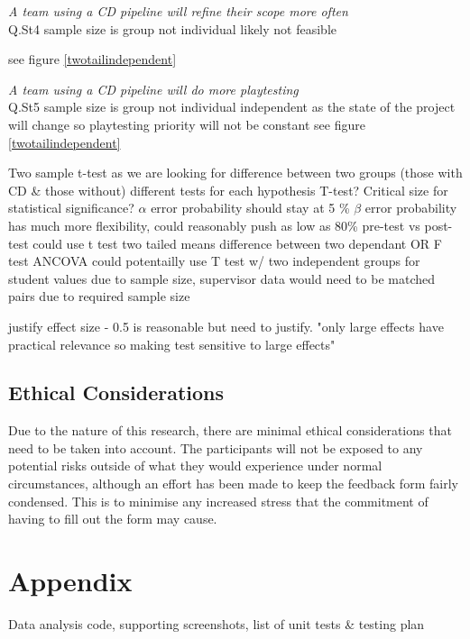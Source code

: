 \documentclass[lettersize,journal]{IEEEtran}
\begin{document}
        \textit{A team using a CD pipeline will refine their scope more often} \\
            Q.St4
            sample size is group not individual
            likely not feasible

            see figure \ref{twotailindependent}

        \textit{A team using a CD pipeline will do more playtesting} \\
            Q.St5
            sample size is group not individual
            independent as the state of the project will change so playtesting priority will not be constant
            see figure \ref{twotailindependent}
    
        Two sample t-test as we are looking for difference between two groups (those with CD \& those without)
        different tests for each hypothesis
        T-test? Critical size for statistical significance?
        $\alpha$ error probability should stay at 5 \%
        $\beta$ error probability has much more flexibility, could reasonably push as low as 80\%
        pre-test vs post-test could use t test two tailed means difference between two dependant OR F test ANCOVA
        could potentailly use T test w/ two independent groups for student values due to sample size, supervisor data would need to be matched pairs due to required sample size

        justify effect size - 0.5 is reasonable but need to justify. "only large effects have practical relevance so making test sensitive to large effects"

    \subsection{Ethical Considerations}
        Due to the nature of this research, there are minimal ethical considerations that need to be taken into account. The participants will not be exposed to any potential risks outside of what they would experience under normal circumstances, although an effort has been made to keep the feedback form fairly condensed. This is to minimise any increased stress that the commitment of having to fill out the form may cause.
    
    \section{Appendix}
    Data analysis code, supporting screenshots, list of unit tests \& testing plan
\end{document}
